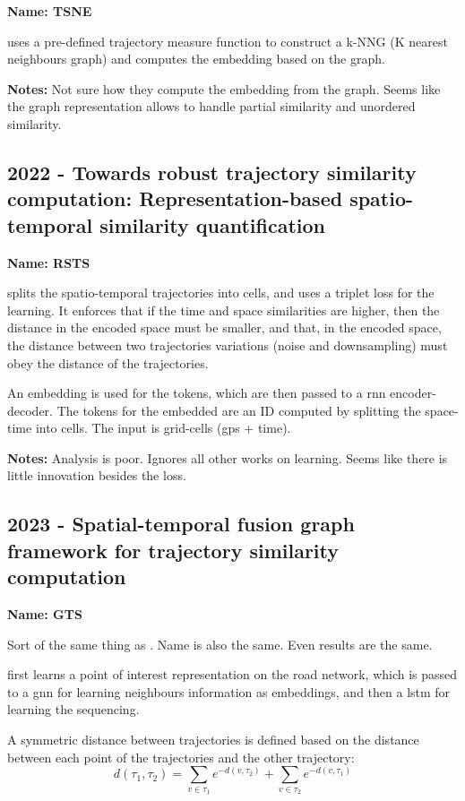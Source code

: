 \textbf{Name: TSNE}

\cite{ding2022tsne} uses a pre-defined trajectory measure function to construct a k-NNG (K nearest neighbours graph) and computes the embedding based on the graph.

\textbf{Notes:} Not sure how they compute the embedding from the graph. Seems like the graph representation allows to handle partial similarity and unordered similarity.

\subsection*{2022 - Towards robust trajectory similarity computation: Representation-based spatio-temporal similarity quantification}

\textbf{Name: RSTS} 

\cite{chen2022towards} splits the spatio-temporal trajectories into cells, and uses a triplet loss for the learning.
%
It enforces that if the time and space similarities are higher, then the distance in the encoded space must be smaller, and that, in the encoded space, the distance between two trajectories variations (noise and downsampling) must obey the distance of the trajectories.

An embedding is used for the tokens, which are then passed to a \gls{rnn} encoder-decoder. The tokens for the embedded are an ID computed by splitting the space-time into cells. The input is grid-cells (gps + time).

\textbf{Notes:} Analysis is poor. Ignores all other works on learning. Seems like there is little innovation besides the loss.


\subsection*{2023 - Spatial-temporal fusion graph framework for trajectory similarity computation}

\textbf{Name: GTS}

Sort of the same thing as \cite{han2021graph}. Name is also the same. Even results are the same.

\cite{zhou2023spatial} first learns a point of interest representation on the road network, which is passed to a \gls{gnn} for learning neighbours information as embeddings, and then a \gls{lstm} for learning the sequencing.

A symmetric distance  between trajectories is defined based on the distance between each point of the trajectories and the other trajectory:
$$
d(\tau_1, \tau_2) = \sum_{v\in\tau_1}e^{-d(v, \tau_2)} + \sum_{v\in\tau_2}e^{-d(v, \tau_1)}
$$

